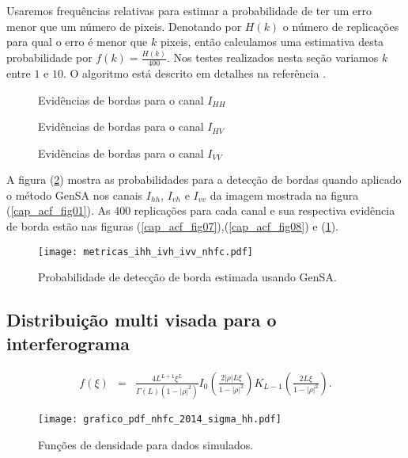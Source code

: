 Usaremos frequências relativas para estimar a probabilidade de ter um erro menor que um número de pixeis. Denotando por $H(k)$ o número de replicações para qual o erro é menor que $k$ pixeis, então calculamos uma estimativa desta probabilidade por $f(k)=\frac{H(k)}{400}$. Nos testes realizados nesta seção variamos $k$ entre $1$ e $10$. O algoritmo está descrito em detalhes na referência \citep{fbgm}. 
\begin{figure}[hbt]
\caption{Evidências de bordas para o canal $I_{HH}$}\label{cap_acf_fig07}
\endminipage\hfill
{}
\caption{Evidências de bordas para o canal $I_{HV}$}\label{cap_acf_fig08}
\endminipage\hfill
\centering
{}
\caption{Evidências de bordas para o canal $I_{VV}$}\label{cap_acf_fig09}
\endminipage\hfill
\end{figure}

	A figura (\ref{cap_acf_fig10}) mostra as probabilidades para a detecção de bordas quando aplicado o método GenSA nos canais $I_{hh}$, $I_{vh}$ e $I_{vv}$ da imagem mostrada na figura (\ref{cap_acf_fig01}). As 400 replicações para cada canal e sua respectiva evidência de borda estão nas figuras (\ref{cap_acf_fig07}),(\ref{cap_acf_fig08}) e (\ref{cap_acf_fig09}).  
\begin{figure}[hbt]
\centering
	\texttt{[image: metricas\_ihh\_ivh\_ivv\_nhfc.pdf]}
	\caption{Probabilidade de detecção de borda estimada usando GenSA.}
\label{cap_acf_fig10}
\end{figure}


\subsection{Distribuição multi visada para o interferograma}

\begin{equation}
\begin{array}{ccc}
	f(\xi)&=&\frac{4L^{L+1}\xi^L}{\Gamma(L)(1-|\rho|^2)}I_0\left(\frac{2|\rho|L\xi}{1-|\rho|^2}\right)K_{L-1}\left(\frac{2L\xi}{1-|\rho|^2}\right).
		\end{array}
\end{equation}

\begin{figure}[hbt]
	\centering
  \texttt{[image: grafico\_pdf\_nhfc\_2014\_sigma\_hh.pdf]}
	\caption{Funções de densidade para dados simulados.}\label{cap_acf_fig02}
\end{figure}

